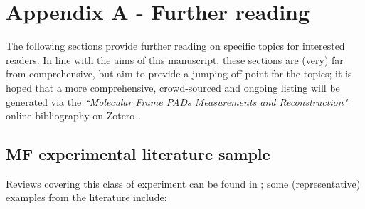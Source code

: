 \documentclass[10pt]{article}
\begin{document}
\section{Appendix A - Further reading\label{sec:Appendix-A}}

The following sections provide further reading on specific topics for interested readers. In line with the aims of this manuscript, these sections are (very) far from comprehensive, but aim to provide a jumping-off point for the topics; it is hoped that a more comprehensive, crowd-sourced and ongoing listing will be generated via the \href{https://www.zotero.org/groups/4733878/molecular_frame_pads_measurements_and_reconstruction}{\textit{``Molecular Frame PADs Measurements and Reconstruction"}} online bibliography on Zotero \cite{hockettZoteroGroupsMolecular}.

\subsection{MF experimental literature sample\label{appendix:MF-expt}}

Reviews covering this class of experiment can be found in  \cite{Yagishita2005,Reid2012,dowek2012PhotoionizationDynamicsPhotoemission,Yagishita2015, jahnke2022PhotoelectronDiffraction}; some (representative) examples from the literature include:
\end{document}
